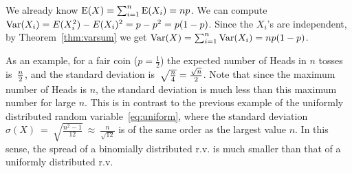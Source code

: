 \documentclass[11pt]{article}
\def\Ex#1{{\rm E}(#1)}
\def\Var#1{{\rm Var}(#1)}
\newcounter{thm}
\begin{document}
We already know $\Ex{X}= \sum_{i=1}^n \Ex{X_i} = np$. We can compute
$\Var{X_i} = E(X_i^2) - E(X_i)^2 = p - p^2 = p(1-p)$. Since the $X_i$'s are independent,
by Theorem~\ref{thm:varsum} we get $\Var{X} = \sum_{i=1}^n \Var{X_i} = np(1-p)$. 

As an example, for a fair coin ($p = \frac{1}{2}$) the expected number of Heads in $n$
tosses is~$n\over 2$, and the standard deviation
is~$\sqrt{\frac{n}{4}} = {{\sqrt{n}}\over 2}$. Note that since the maximum number of
Heads is $n$, the standard deviation is much less than this maximum
number for large $n$. This is in contrast to the previous example of
the uniformly distributed random variable~\eqref{eq:uniform}, where the standard
deviation $\sigma(X) ~=~ \sqrt{\frac{n^2-1}{12}} ~\approx~ \frac{n}{\sqrt{12}}$ is
of the same order as the largest value $n$. In this sense, the
spread of a binomially distributed r.v. is much smaller than that
of a uniformly distributed r.v.
\end{document}
